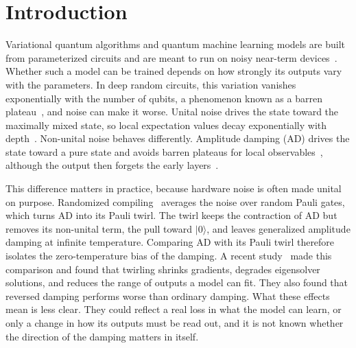 \documentclass[
 aps,pra,
 twocolumn,
 superscriptaddress,
 longbibliography,
 nofootinbib
]{revtex4-2}
\providecommand{\ket}[1]{\lvert #1 \rangle}
\begin{document}
\maketitle

\section{Introduction}
\label{sec:intro}

Variational quantum algorithms and quantum machine learning models are built
from parameterized circuits and are meant to run on noisy near-term
devices~\cite{preskill2018nisq,cerezo2021variational,bharti2022noisy}. Whether
such a model can be trained depends on how strongly its outputs vary with the
parameters. In deep random circuits, this variation vanishes exponentially with
the number of qubits, a phenomenon known as a barren
plateau~\cite{mcclean2018barren,cerezo2021cost,larocca2025barren}, and noise can
make it worse. Unital noise drives the state toward the maximally mixed state,
so local expectation values decay exponentially with
depth~\cite{wang2021noiseinduced,stilckfranca2021limitations}. Non-unital noise
behaves differently. Amplitude damping (AD) drives the state toward a pure state
and avoids barren plateaus for local observables~\cite{mele2026noise}, although
the output then forgets the early
layers~\cite{schumann2024emergence,singkanipa2025beyond}.

This difference matters in practice, because hardware noise is often made
unital on purpose. Randomized
compiling~\cite{wallman2016noise,hashim2021randomized} averages the noise over
random Pauli gates, which turns AD into its Pauli twirl. The twirl keeps the
contraction of AD but removes its non-unital term, the pull toward $\ket{0}$,
and leaves generalized amplitude damping at infinite temperature. Comparing AD
with its Pauli twirl therefore isolates the zero-temperature bias of the
damping. A recent study~\cite{vanrossum2026biased} made
this comparison and found that twirling shrinks gradients, degrades eigensolver
solutions, and reduces the range of outputs a model can fit. They also found
that reversed damping performs worse than ordinary damping. What these effects
mean is less clear. They could reflect a real loss in what the model can learn,
or only a change in how its outputs must be read out, and it is not known
whether the direction of the damping matters in itself.
\end{document}
